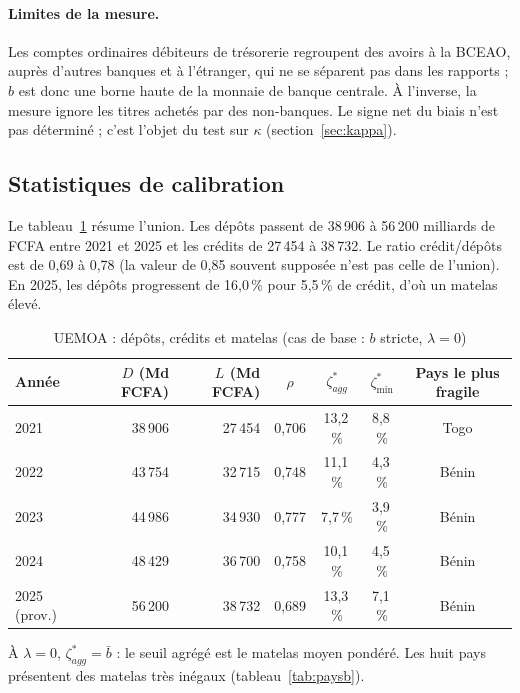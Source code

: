 \documentclass[11pt,a4paper]{article}
\newcommand{\zs}{\zeta^{*}}
\begin{document}
	\paragraph{Limites de la mesure.} Les comptes ordinaires débiteurs de trésorerie regroupent des avoirs à la BCEAO, auprès d'autres banques et à l'étranger, qui ne se séparent pas dans les rapports ; $b$ est donc une borne haute de la monnaie de banque centrale. À l'inverse, la mesure ignore les titres achetés par des non-banques. Le signe net du biais n'est pas déterminé ; c'est l'objet du test sur $\kappa$ (section~\ref{sec:kappa}).
	
	\subsection{Statistiques de calibration}
	
	Le tableau~\ref{tab:uemoa} résume l'union. Les dépôts passent de 38\,906 à 56\,200 milliards de FCFA entre 2021 et 2025 et les crédits de 27\,454 à 38\,732. Le ratio crédit/dépôts est de 0,69 à 0,78 (la valeur de 0,85 souvent supposée n'est pas celle de l'union). En 2025, les dépôts progressent de 16,0\,\% pour 5,5\,\% de crédit, d'où un matelas élevé.
	
	\begin{table}[htbp]
		\centering
		\caption{UEMOA : dépôts, crédits et matelas (cas de base : $b$ stricte, $\lambda=0$)}\label{tab:uemoa}
		\small
		\begin{tabular}{lrrcccc}
			\toprule
			Année & $D$ (Md FCFA) & $L$ (Md FCFA) & $\rho$ & $\zs_{agg}$ & $\zs_{\min}$ & Pays le plus fragile \\
			\midrule
			2021 & 38\,906 & 27\,454 & 0,706 & 13,2\,\% & 8,8\,\% & Togo \\
			2022 & 43\,754 & 32\,715 & 0,748 & 11,1\,\% & 4,3\,\% & Bénin \\
			2023 & 44\,986 & 34\,930 & 0,777 & 7,7\,\% & 3,9\,\% & Bénin \\
			2024 & 48\,429 & 36\,700 & 0,758 & 10,1\,\% & 4,5\,\% & Bénin \\
			2025 (prov.) & 56\,200 & 38\,732 & 0,689 & 13,3\,\% & 7,1\,\% & Bénin \\
			\bottomrule
		\end{tabular}
	\end{table}
	
	À $\lambda=0$, $\zs_{agg}=\bar b$ : le seuil agrégé est le matelas moyen pondéré. Les huit pays présentent des matelas très inégaux (tableau~\ref{tab:paysb}).
	
\end{document}
